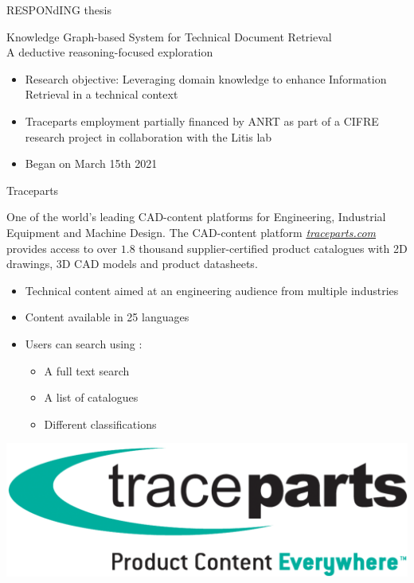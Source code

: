 \begin{frame}{RESPONdING thesis}
    \begin{center}
        Knowledge Graph-based System for Technical Document Retrieval\\A deductive reasoning-focused exploration
    \end{center}
    
    \begin{itemize}
        \item Research objective: Leveraging domain knowledge to enhance Information Retrieval in a technical context
        \item Traceparts employment partially financed by ANRT as part of a CIFRE research project in collaboration with the Litis lab
        \item Began on March 15th 2021
    \end{itemize}
    
\end{frame}

\begin{frame}{Traceparts}

    One of the world's leading CAD-content platforms for Engineering, Industrial Equipment and Machine Design. The CAD-content platform \emph{\href{http://traceparts.com/}{traceparts.com}} provides access to over $1.8$ thousand supplier-certified product catalogues with 2D drawings, 3D CAD models and product datasheets.

    \begin{itemize}
        \item Technical content aimed at an engineering audience from multiple industries
        \item Content available in 25 languages
        \item Users can search using :
        \begin{itemize}
            \item A full text search
            \item A list of catalogues
            \item Different classifications
        \end{itemize}
    \end{itemize}
    
    \begin{center}
        \includegraphics[scale=0.1]{images/traceparts_logo.png}
    \end{center}
    
\end{frame}